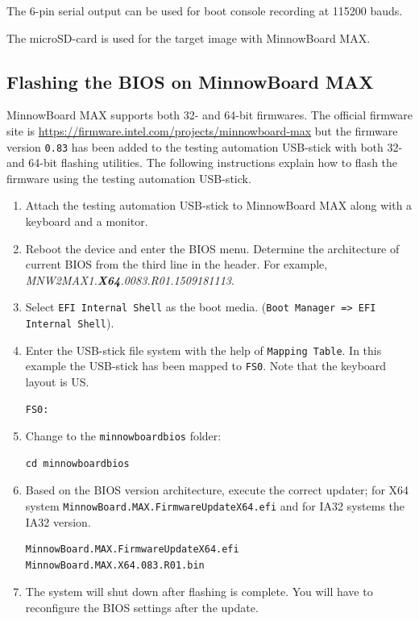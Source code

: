 \documentclass[a4paper,11pt]{article}
\newcommand{\cmd}[1]{\texttt{#1}}
\begin{document}
The 6-pin serial output can be used for boot console recording at 115200 bauds.

The microSD-card is used for the target image with MinnowBoard MAX.

\subsection{Flashing the BIOS on MinnowBoard MAX}

MinnowBoard MAX supports both 32- and 64-bit firmwares. The official firmware site is \url{https://firmware.intel.com/projects/minnowboard-max} but the firmware version \cmd{0.83} has been added to the testing automation USB-stick with both 32- and 64-bit flashing utilities. The following instructions explain how to flash the firmware using the testing automation USB-stick.

\begin{enumerate}
\item Attach the testing automation USB-stick to MinnowBoard MAX along with a keyboard and a monitor.

\item Reboot the device and enter the BIOS menu. Determine the architecture of current BIOS from the third line in the header. For example, \textit{MNW2MAX1.\textbf{X64}.0083.R01.1509181113}.

\item Select \cmd{EFI Internal Shell} as the boot media. (\cmd{Boot Manager => EFI Internal Shell}).

\item Enter the USB-stick file system with the help of \cmd{Mapping Table}. In this example the USB-stick has been mapped to \cmd{FS0}. Note that the keyboard layout is US.
\begin{lstlisting}
FS0:
\end{lstlisting}

\item Change to the \cmd{minnowboardbios} folder:
\begin{lstlisting}
cd minnowboardbios
\end{lstlisting}

\item Based on the BIOS version architecture, execute the correct updater; for X64 system \cmd{MinnowBoard.MAX.FirmwareUpdateX64.efi} and for IA32 systems the IA32 version.
\begin{lstlisting}
MinnowBoard.MAX.FirmwareUpdateX64.efi MinnowBoard.MAX.X64.083.R01.bin
\end{lstlisting}

\item The system will shut down after flashing is complete. You will have to reconfigure the BIOS settings after the update.
\end{enumerate}
\end{document}
